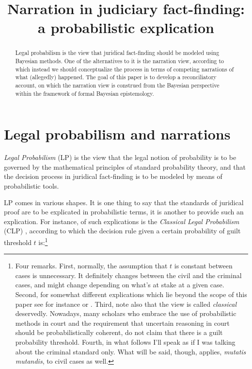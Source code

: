 \documentclass[10pt,leqno]{article}
\begin{document}



\title{Narration in judiciary fact-finding:\\ a probabilistic explication}

\date{}


\maketitle



\begin{abstract}
Legal probabilism  is the view that juridical fact-finding should be modeled using Bayesian methods. One of the alternatives to it  is the narration view, according to which instead we should conceptualize the process in terms of competing narrations of what (allegedly) happened. The goal of this paper is to develop a reconciliatory account, on which the narration view is construed from the Bayesian perspective within the framework of formal Bayesian epistemology. 
\end{abstract}




\section{Legal probabilism and narrations}\label{sec:CLPandissues}


\emph{Legal Probabilism} (LP)  is the view that the legal notion of probability is to be governed by the 
ma\-the\-ma\-ti\-cal principles of standard probability theory, and that the decision process in juridical fact-finding is to be modeled by means of probabilistic tools.

LP comes in various shapes. It is one thing to say that the standards of juridical proof are to be explicated in probabilistic terms, it is another to provide such an explication. For instance, of such explications is the  \emph{Classical Legal Probabilism} (CLP) \citep{Bernoulli1713Ars-conjectandi},  according to which  the decision rule  given a certain probability of guilt threshold $t$ is:\footnote{Four remarks. First, normally, the assumption that $t$ is constant between cases is unnecessary. It definitely changes between the civil and the criminal cases, and might change depending on what's at stake at a given case. Second, for somewhat different explications which lie beyond the scope of this paper see for instance \citep{cheng2012reconceptualizing} or \citep{kaplow2014likelihood}. Third, note also that the view is called \emph{classical} deservedly. Nowadays, many scholars who embrace the use of probabilistic methods in court and the requirement that uncertain reasoning in court should be probabilistically coherent, do not claim that there is a guilt probability threshold. Fourth, in what follows I'll speak as if I was talking about the criminal standard only. What will be said, though, applies, \emph{mutatis mutandis}, to civil cases as well.}
\end{document}
